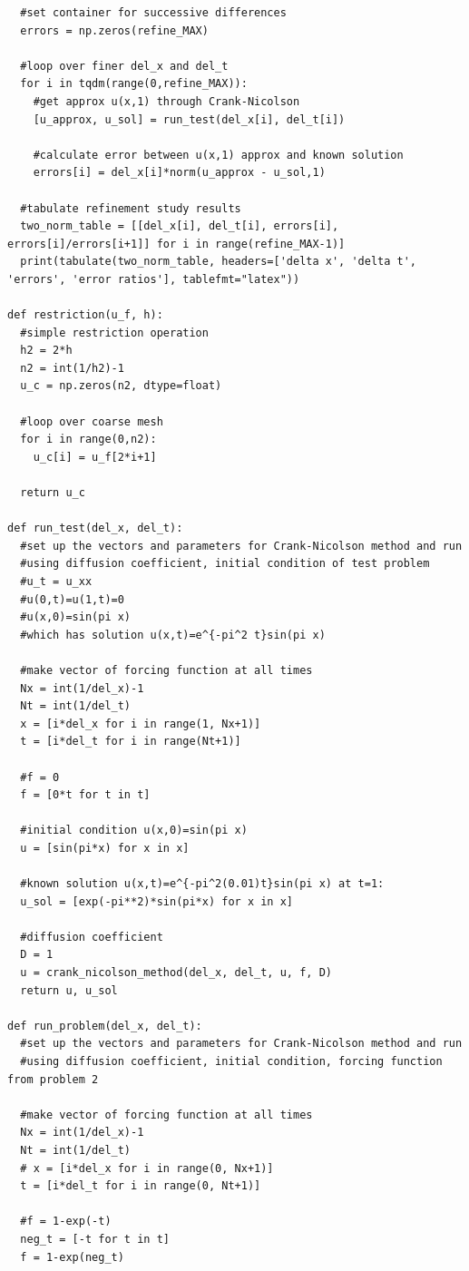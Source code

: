 \documentclass[12pt]{article}
\begin{document}
\begin{verbatim}
  #set container for successive differences
  errors = np.zeros(refine_MAX)

  #loop over finer del_x and del_t
  for i in tqdm(range(0,refine_MAX)):
    #get approx u(x,1) through Crank-Nicolson
    [u_approx, u_sol] = run_test(del_x[i], del_t[i])
    
    #calculate error between u(x,1) approx and known solution 
    errors[i] = del_x[i]*norm(u_approx - u_sol,1)

  #tabulate refinement study results
  two_norm_table = [[del_x[i], del_t[i], errors[i], errors[i]/errors[i+1]] for i in range(refine_MAX-1)]  
  print(tabulate(two_norm_table, headers=['delta x', 'delta t', 'errors', 'error ratios'], tablefmt="latex"))

def restriction(u_f, h):
  #simple restriction operation
  h2 = 2*h
  n2 = int(1/h2)-1
  u_c = np.zeros(n2, dtype=float)

  #loop over coarse mesh
  for i in range(0,n2):
    u_c[i] = u_f[2*i+1]
    
  return u_c

def run_test(del_x, del_t):
  #set up the vectors and parameters for Crank-Nicolson method and run
  #using diffusion coefficient, initial condition of test problem
  #u_t = u_xx
  #u(0,t)=u(1,t)=0
  #u(x,0)=sin(pi x)
  #which has solution u(x,t)=e^{-pi^2 t}sin(pi x)

  #make vector of forcing function at all times 
  Nx = int(1/del_x)-1
  Nt = int(1/del_t)
  x = [i*del_x for i in range(1, Nx+1)]
  t = [i*del_t for i in range(Nt+1)]
  
  #f = 0
  f = [0*t for t in t]
  
  #initial condition u(x,0)=sin(pi x)
  u = [sin(pi*x) for x in x]

  #known solution u(x,t)=e^{-pi^2(0.01)t}sin(pi x) at t=1:
  u_sol = [exp(-pi**2)*sin(pi*x) for x in x]

  #diffusion coefficient
  D = 1
  u = crank_nicolson_method(del_x, del_t, u, f, D)
  return u, u_sol 

def run_problem(del_x, del_t):
  #set up the vectors and parameters for Crank-Nicolson method and run
  #using diffusion coefficient, initial condition, forcing function from problem 2

  #make vector of forcing function at all times 
  Nx = int(1/del_x)-1
  Nt = int(1/del_t)
  # x = [i*del_x for i in range(0, Nx+1)]
  t = [i*del_t for i in range(0, Nt+1)]
  
  #f = 1-exp(-t)
  neg_t = [-t for t in t] 
  f = 1-exp(neg_t)
  

\end{verbatim}
\end{document}
